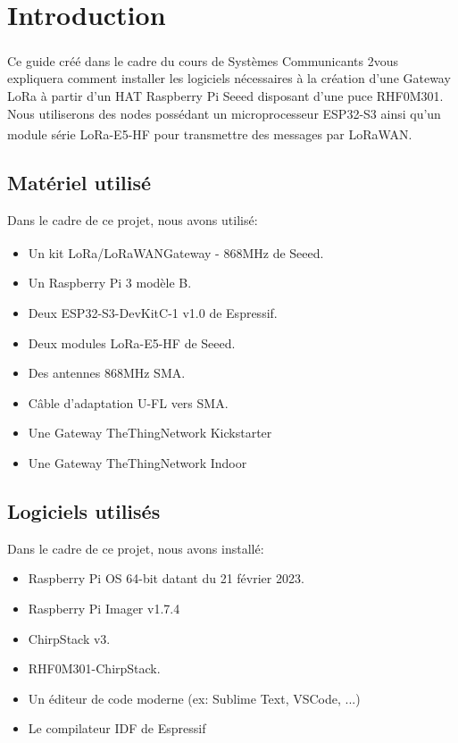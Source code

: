 \documentclass{article}
\begin{document}
	\maketitle
	\newpage
	\tableofcontents
	\newpage
	\section{Introduction}
		Ce guide créé dans le cadre du cours de Systèmes Communicants 2\textsuperscript\textcopyright vous expliquera comment installer les logiciels nécessaires à la création d'une Gateway LoRa à partir d'un HAT Raspberry Pi Seeed disposant d'une puce RHF0M301.\\
		Nous utiliserons des nodes possédant un microprocesseur ESP32-S3 ainsi qu'un module série LoRa-E5-HF pour transmettre des messages par LoRaWAN\textsuperscript\textregistered.
		\subsection{Matériel utilisé}
			Dans le cadre de ce projet, nous avons utilisé:
			\begin{itemize}
				\item Un kit LoRa/LoRaWAN\textsuperscript\textregistered Gateway - 868MHz de Seeed.
				\item Un Raspberry Pi 3 modèle B.
				\item Deux ESP32-S3-DevKitC-1 v1.0 de Espressif.
				\item Deux modules LoRa-E5-HF de Seeed.
				\item Des antennes 868MHz SMA.
				\item Câble d'adaptation U-FL vers SMA.
				\item Une Gateway TheThingNetwork Kickstarter
				\item Une Gateway TheThingNetwork Indoor 
			\end{itemize}
		\subsection{Logiciels utilisés}
			Dans le cadre de ce projet, nous avons installé:
				\begin{itemize}
				\item Raspberry Pi OS 64-bit datant du 21 février 2023.
				\item Raspberry Pi Imager v1.7.4
				\item ChirpStack v3.
				\item RHF0M301-ChirpStack.
				\item Un éditeur de code moderne (ex: Sublime Text, VSCode, ...)
				\item Le compilateur IDF de Espressif
			\end{itemize}
\end{document}
